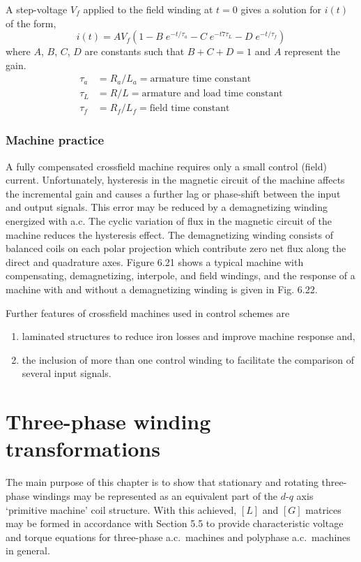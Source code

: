 \documentclass[a4paper,numbers=noenddot,12pt]{scrbook}
\begin{document}
A step-voltage $V_f$ applied to the field winding at $t = 0$ gives a solution for $i(t)$ of the form,
\begin{equation}
    i(t) = A V_f(1 - B \; e^{-t/\tau_a} - C \; e^{-t7\tau_L} - D \; e^{-t/\tau_f})
    \label{eq:Eq6.100}
\end{equation}
where $A$, $B$, $C$, $D$ are constants such that $B + C + D = 1$ and $A$ represent the gain.
\begin{align*}
    \tau_a & = R_a / L_a = \text{armature time constant} \\
    \tau_L & = R / L = \text{armature and load time constant} \\
    \tau_f & = R_f / L_f = \text{field time constant}
\end{align*}

\subsection{Machine practice} A fully compensated crossfield machine requires only a small control (field) current. Unfortunately, hysteresis in the magnetic circuit of the machine affects the incremental gain and causes a further lag or phase-shift between the input and output signals. This error may be reduced by a demagnetizing winding energized with a.c. The cyclic variation of flux in the magnetic circuit of the machine reduces the hysteresis effect. The demagnetizing winding
consists of balanced coils on each polar projection which contribute zero net flux along the direct and quadrature axes. Figure 6.21 shows a typical machine with compensating, demagnetizing, interpole, and field windings, and the response of a machine with and without a demagnetizing winding is given in Fig. 6.22.

Further features of crossfield machines used in control schemes are
\begin{enumerate}[label={(\alph*)}]
    \item laminated structures to reduce iron losses and improve machine response and,
    \item the inclusion of more than one control winding to facilitate the comparison of several input signals.
\end{enumerate}

\chapter{Three-phase winding transformations}
The main purpose of this chapter is to show that stationary and rotating three-phase windings may be represented as an equivalent part of the $d$-$q$ axis `primitive machine' coil structure. With this achieved, $[L]$ and $[G]$ matrices may be formed in accordance with Section 5.5 to provide characteristic voltage and torque equations for three-phase a.c.\ machines and polyphase a.c.\ machines in general.
\end{document}
